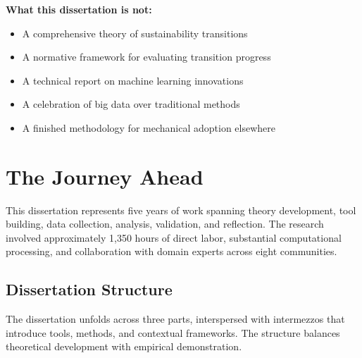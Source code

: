 \documentclass[../main.tex]{subfiles}
\begin{document}
\begin{importantbox}
\textbf{What this dissertation is not:}
\begin{itemize}[leftmargin=*, itemsep=0.2em]
\item A comprehensive theory of sustainability transitions
\item A normative framework for evaluating transition progress
\item A technical report on machine learning innovations
\item A celebration of big data over traditional methods
\item A finished methodology for mechanical adoption elsewhere
\end{itemize}
\end{importantbox}


\section{The Journey Ahead}
\label{sec:intro:journey}

This dissertation represents five years of work spanning theory development, tool building, data collection, analysis, validation, and reflection. The research involved approximately 1,350 hours of direct labor, substantial computational processing, and collaboration with domain experts across eight communities.

\subsection{Dissertation Structure}

The dissertation unfolds across three parts, interspersed with intermezzos that introduce tools, methods, and contextual frameworks. The structure balances theoretical development with empirical demonstration.
\end{document}
